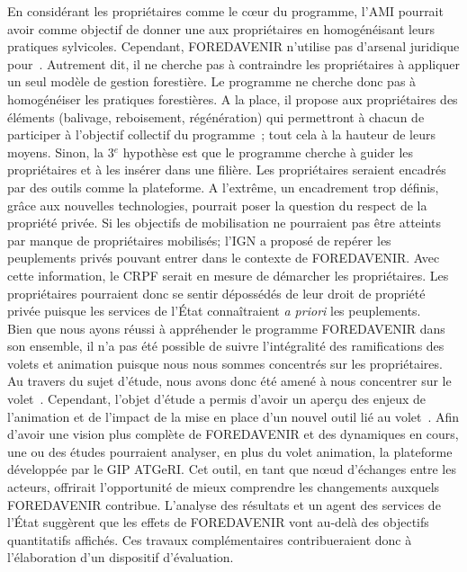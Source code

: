 \documentclass[12pt]{report}
\newcommand\indexp[1]{#1\index{#1}}
\begin{document}
En considérant les propriétaires comme le c\oe{}ur du programme, l'AMI pourrait
avoir comme objectif de donner une  aux propriétaires
en homogénéisant leurs pratiques sylvicoles. Cependant, \indexp{FOREDAVENIR}
n'utilise pas d'arsenal juridique pour~.
Autrement dit, il ne cherche pas à contraindre les propriétaires à appliquer un
seul modèle de gestion forestière. Le programme ne cherche donc pas à homogénéiser
les pratiques forestières. A la place, il propose aux propriétaires des éléments
(balivage, reboisement, régénération) qui permettront à chacun de participer à
l'objectif collectif du programme~; tout cela à la hauteur de leurs moyens. Sinon,
la 3$^{e}$ hypothèse est que le programme cherche à guider les propriétaires et
à les insérer dans une filière. Les propriétaires seraient encadrés par des outils
comme la plateforme. A l'extrême, un encadrement trop définis, grâce aux nouvelles
technologies, pourrait poser la question du respect de la propriété privée. Si
les objectifs de mobilisation ne pourraient pas être atteints par manque de
propriétaires mobilisés; l'IGN a proposé de repérer les peuplements privés pouvant
entrer dans le contexte de FOREDAVENIR. Avec cette information, le CRPF serait
en mesure de démarcher les propriétaires. Les propriétaires pourraient donc se
sentir dépossédés de leur droit de propriété privée puisque les services de
l’État connaîtraient \textit{a priori} les peuplements.\\

Bien que nous ayons réussi à appréhender le programme FOREDAVENIR dans son ensemble,
il n'a pas été possible de suivre l'intégralité des ramifications des volets
 et animation
puisque nous nous sommes concentrés sur les propriétaires. Au travers du sujet
d'étude, nous avons donc été amené à nous concentrer sur le volet~. Cependant, l'objet d'étude a
permis d'avoir un aperçu des enjeux de l'animation et de l'impact de la
mise en place d'un nouvel outil lié au volet~. Afin d'avoir une vision plus complète de FOREDAVENIR et des
dynamiques en cours, une ou des études pourraient analyser, en plus du volet
animation, la plateforme développée par le GIP ATGeRI. Cet outil, en tant que
n\oe{}ud d'échanges entre les acteurs, offrirait l'opportunité de mieux
comprendre les changements auxquels FOREDAVENIR contribue. L'analyse des
résultats et un agent des services de l'État suggèrent que les effets de FOREDAVENIR
vont au-delà des objectifs quantitatifs affichés. Ces travaux complémentaires
contribueraient donc à l'élaboration d'un dispositif d'évaluation.
\end{document}
